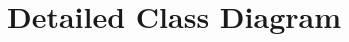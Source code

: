 \documentclass[]{article}
\begin{document}
\section{Detailed Class Diagram}
\label{sec:detailed_class_diagram}
\begin{center}
  \newpage
\end{center}
\newpage
\appendix
\end{document}
